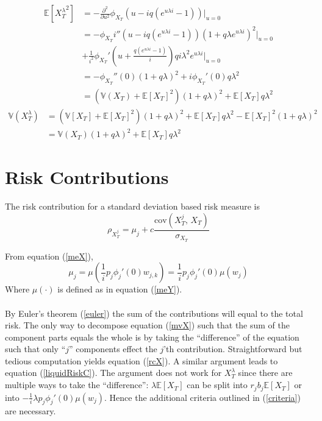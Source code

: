 \documentclass[12pt]{article}
\theoremstyle{definition}
\begin{document}
\begin{align}\mathbb{E}\left[{X_T^\lambda} ^2 \right]&=-\frac{\partial^2  }{\partial u^2} \phi_{X_T}\left(u-iq(e^{u\lambda i}-1)\right)\bigg|_{u=0}\\
&=-\phi_{X_T}i''\left(u-iq(e^{u\lambda i}-1)\right) \left(1+q  \lambda e^{u\lambda i} \right)^2 \big|_{u=0}\nonumber\\&+\frac{1}{i^2}\phi_{X_T}'\left(u+\frac{q(e^{u\lambda i}-1)}{i}\right)q i \lambda^2  e^{u\lambda i}   \big|_{u=0}  \\
&=-\phi_{X_T} '' (0)(1+q \lambda)^2+i\phi_{X_T}'(0)  q \lambda^2\\
&=\left(\mathbb{V}(X_T)+\mathbb{E}[X_T]^2 \right)(1+q\lambda)^2+\mathbb{E}[X_T]q\lambda^2 \end{align}
\begin{align} \mathbb{V}(X_T ^ \lambda)&=\left(\mathbb{V}[X_T]+\mathbb{E}[X_T]^2 \right)(1+q\lambda)^2+\mathbb{E}[X_T]q\lambda^2-\mathbb{E}[X_T]^2(1+q\lambda)^2\\
&=\mathbb{V}(X_T)(1+q\lambda)^2+\mathbb{E}[X_T]q\lambda^2\end{align}

\section{Risk Contributions} \label{rc}
The risk contribution for a standard deviation based risk measure is 
\begin{equation}
\rho_{X_T^j}=\mu_j+c\frac{\mathrm{cov}(X_T ^ j,\,X_T)}{\sigma_{X_T}}
\end{equation}

From equation (\ref{meX}), 
\begin{equation}
\mu_j=\mu\left(\frac{1}{i} p_j \phi_j'(0) w_{j, k}\right)=\frac{1}{i} p_j \phi_j'(0) \mu\left( w_{j}\right)
\end{equation}
Where \(\mu(\cdot)\) is defined as in equation (\ref{meY}).  
\\
\\
By Euler's theorem (\ref{euler}) the sum of the contributions will equal to the total risk.  The only way to decompose equation (\ref{mvX}) such that the sum of the component parts equals the whole is by taking the ``difference'' of the equation such that only ``\(j\)'' components effect the \(j\)'th contribution.  Straightforward but tedious computation yields equation (\ref{rcX}).  A similar argument leads to equation (\ref{liquidRiskC}).  The argument does not work for \(X_T ^ \lambda\) since there are multiple ways to take the ``difference'': \(\lambda\mathbb{E}[X_T]\) can be split into \(r_j b_j \mathbb{E}[X_T]\) or into \(-\frac{1}{i}\lambda p_j \phi_j '(0) \mu(w_j)\).  Hence the additional criteria outlined in (\ref{criteria}) are necessary.
\end{document}
